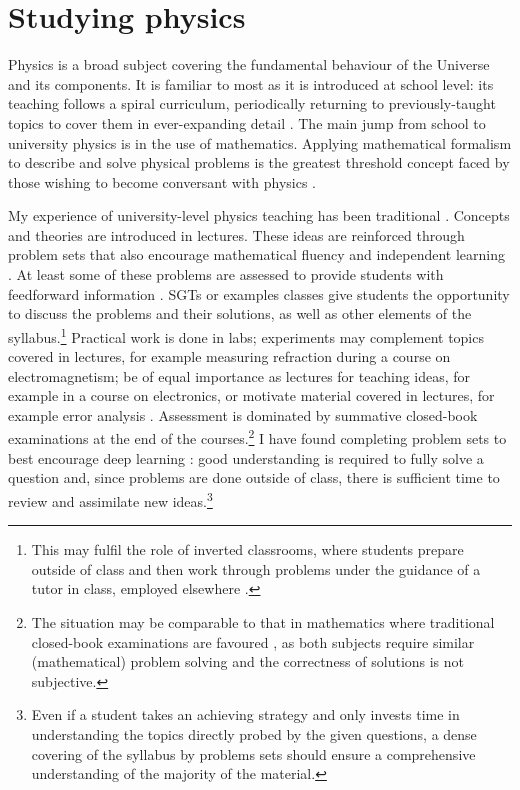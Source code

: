 \section{Studying physics}\label{sec:physics}

Physics is a broad subject covering the fundamental behaviour of the Universe and its components. It is familiar to most as it is introduced at school level: its teaching follows a spiral curriculum, periodically returning to previously-taught topics to cover them in ever-expanding detail \citep{Bruner1960}. The main jump from school to university physics is in the use of mathematics. Applying mathematical formalism to describe and solve physical problems is the greatest threshold concept \citep{Meyer2003} faced by those wishing to become conversant with physics \citep{Wigner1960,Roth1994}.

My experience of university-level physics teaching has been traditional \citep[cf.][]{Iannone2015}. Concepts and theories are introduced in lectures. These ideas are reinforced through problem sets that also encourage mathematical fluency and independent learning \citep{Pike2015}. At least some of these problems are assessed to provide students with feedforward information \citep{Bloxham2015}. SGTs or examples classes give students the opportunity to discuss the problems and their solutions, as well as other elements of the syllabus.\footnote{This may fulfil the role of inverted classrooms, where students prepare outside of class and then work through problems under the guidance of a tutor in class, employed elsewhere \citep{Lage2000}.} Practical work is done in labs; experiments may complement topics covered in lectures, for example measuring refraction during a course on electromagnetism; be of equal importance as lectures for teaching ideas, for example in a course on electronics, or motivate material covered in lectures, for example error analysis \citep{Hanif2009}. Assessment is dominated by summative closed-book examinations at the end of the courses.\footnote{The situation may be comparable to that in mathematics where traditional closed-book examinations are favoured \citep{Iannone2014}, as both subjects require similar (mathematical) problem solving and the correctness of solutions is not subjective.} I have found completing problem sets to best encourage deep learning \citep{Marton1976,Marton1976a}: good understanding is required to fully solve a question and, since problems are done outside of class, there is sufficient time to review and assimilate new ideas.\footnote{Even if a student takes an achieving strategy \citep[chapter 2]{Biggs1987} and only invests time in understanding the topics directly probed by the given questions, a dense covering of the syllabus by problems sets should ensure a comprehensive understanding of the majority of the material.}

